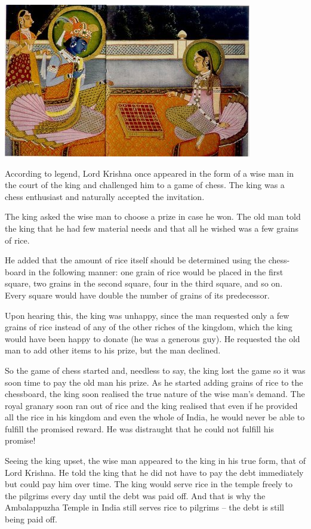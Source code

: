 \documentclass[
  a4paper]{book}
\begin{document}
\begin{center}\includegraphics[width=0.5\linewidth]{images/Radha-Krishna_chess} \end{center}

According to legend, Lord Krishna once appeared in the form of a wise man in the court of the king and challenged him to a game of chess. The king was a chess enthusiast and naturally accepted the invitation.

The king asked the wise man to choose a prize in case he won. The old man told the king that he had few material needs and that all he wished was a few grains of rice.

He added that the amount of rice itself should be determined using the chess- board in the following manner: one grain of rice would be placed in the first square, two grains in the second square, four in the third square, and so on. Every square would have double the number of grains of its predecessor.

Upon hearing this, the king was unhappy, since the man requested only a few grains of rice instead of any of the other riches of the kingdom, which the king would have been happy to donate (he was a generous guy). He requested the old man to add other items to his prize, but the man declined.

So the game of chess started and, needless to say, the king lost the game so it was soon time to pay the old man his prize. As he started adding grains of rice to the chessboard, the king soon realised the true nature of the wise man's demand. The royal granary soon ran out of rice and the king realised that even if he provided all the rice in his kingdom and even the whole of India, he would never be able to fulfill the promised reward. He was distraught that he could not fulfill his promise!

Seeing the king upset, the wise man appeared to the king in his true form, that of Lord Krishna. He told the king that he did not have to pay the debt immediately but could pay him over time. The king would serve rice in the temple freely to the pilgrims every day until the debt was paid off. And that is why the Ambalappuzha Temple in India still serves rice to pilgrims -- the debt is still being paid off.
\end{document}
